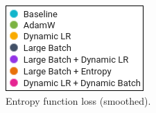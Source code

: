 \documentclass[10pt,conference]{IEEEtran}
\begin{document}
\begin{figure}[htbp]
  \centering
  \begin{minipage}[b]{\textwidth}
    \centering
  \end{minipage}
  \hfill
  \begin{minipage}[b]{\textwidth}
    \centering
    \includegraphics{figs/legend.png}
    \caption{Entropy function loss (smoothed).}
    \label{fig:entropy_loss}
  \end{minipage}
\end{figure}
\end{document}

